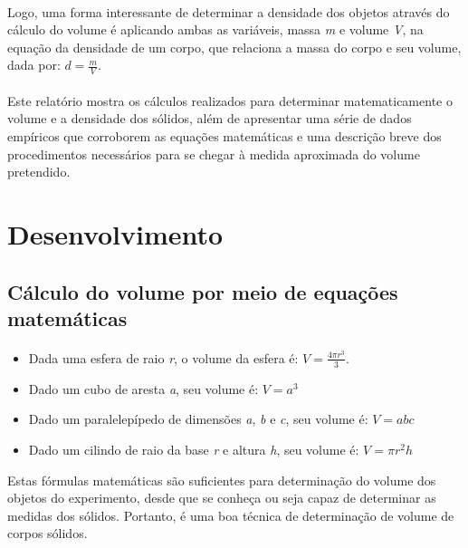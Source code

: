 \documentclass[12pt]{article}
\begin{document}
\paragraph*{}
Logo, uma forma interessante de determinar a densidade dos objetos através do cálculo do volume é aplicando ambas as variáveis, massa \textit{m} e volume \textit{V}, na equação da densidade de um corpo, que relaciona a massa do corpo e seu volume, dada por: $d = \frac{m}{V}$.
\paragraph*{}
Este relatório mostra os cálculos realizados para determinar matematicamente o volume e a densidade dos sólidos, além de apresentar uma série de dados empíricos que corroborem as equações matemáticas e uma descrição breve dos procedimentos necessários para se chegar à medida aproximada do volume pretendido.  
    


\section{Desenvolvimento}
\label{sec:examples}

\subsection{Cálculo do volume por meio de equações matemáticas}
\paragraph{}
\begin{itemize}
\item Dada uma esfera de raio \textit{r}, o volume da esfera é: $V = \frac{4 \pi r^3 }{3}$.

\item Dado um cubo de aresta \textit{a}, seu volume é: $ V = a^3 $

\item Dado um paralelepípedo de dimensões \textit{a}, \textit{b} e \textit{c}, seu volume é: $V = abc$

\item Dado um cilindo de raio da base \textit{r} e altura \textit{h}, seu volume é: $ V = \pi r^2h$

\end{itemize}

Estas fórmulas matemáticas são suficientes para determinação do volume dos objetos do experimento, desde que se conheça ou seja capaz de determinar as medidas dos sólidos. Portanto, é uma boa técnica de determinação de volume de corpos sólidos. 
\end{document}
